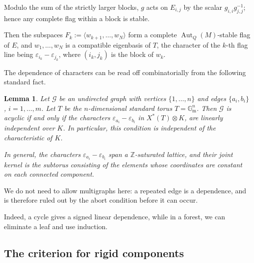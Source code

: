 \documentclass[12pt]{article}
\newtheorem{lemma}[theorem]{Lemma}
\newcommand{\Z}{\mathbb{Z}}
\newcommand{\Aut}{\operatorname{Aut}}
\newcommand{\grph}{\mathcal{G}}
\newcommand{\Multgrp}{\mathbb{G}_{\operatorname{m}}}
\begin{document}
Modulo the sum of the strictly larger blocks, $g$ acts on $E_{i,j}$ by the scalar $g_{i,i}g_{j,j}^{-1}$; hence any complete flag within a block is stable.


Then the subspaces
$F_k:=\langle w_{k+1},\dots,w_N\rangle$ form a complete
$\Aut_Q(M)$-stable flag of $E$, and $w_1,\dots,w_N$ is a compatible
eigenbasis of $T$, the character of the $k$-th flag line being
$\varepsilon_{i_k}-\varepsilon_{j_k}$, where $(i_k,j_k)$ is the
block of $w_k$.


The dependence of characters can be read off combinatorially from the following standard fact.

\begin{lemma}\label{lem:cycle}
Let $\grph$ be an undirected graph with vertices $\{1,\dots,n\}$ and edges $\{a_i,b_i\}$, $i=1,\dots,m$.
Let $T$ be the $n$-dimensional standard torus $T=\Multgrp^n$.
Then $\grph$ is acyclic if and only if 
the characters $\varepsilon_{a_i}-\varepsilon_{b_i}$ in $X^*(T)\otimes K$,  are linearly independent over $K$.
In particular, this condition is independent of the characteristic of $K$.

In general, the characters $\varepsilon_{a_i}-\varepsilon_{b_i}$ span a $\Z$-saturated lattice, and their joint kernel
is the subtorus consisting of the elements whose coordinates are constant on each connected component.
\end{lemma}

We do not need to allow multigraphs here: a repeated edge is a dependence, and is therefore ruled out by
the abort condition before it can occur.

Indeed, a cycle gives a signed linear dependence, while in a forest, we can eliminate a leaf and use induction.

\subsection{The criterion for rigid components}
\end{document}
